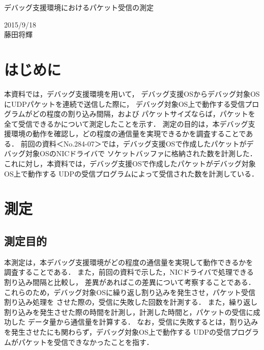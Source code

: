 \documentclass[12pt]{jsarticle}
\begin{document}

\begin{center}
    {\LARGE デバッグ支援環境におけるパケット受信の測定}
\end{center}

\begin{flushright}
    2015/9/18\\
    藤田将輝
\end{flushright}
\section{はじめに}
本資料では，デバッグ支援環境を用いて，
デバッグ支援OSからデバッグ対象OSにUDPパケットを連続で送信した際に，
デバッグ対象OS上で動作する受信プログラムがどの程度の割り込み間隔，および
パケットサイズならば，パケットを全て受信できるかについて測定したことを示す．
測定の目的は，本デバッグ支援環境の動作を確認し，どの程度の通信量を実現できるかを調査することである．
前回の資料＜No.284-07＞では，デバッグ支援OSで作成したパケットがデバッグ対象OSのNICドライバで
ソケットバッファに格納された数を計測した．
これに対し，本資料では，デバッグ支援OSで作成したパケットがデバッグ対象OS上で動作する
UDPの受信プログラムによって受信された数を計測している．

\section{測定}
\subsection{測定目的}
本測定は，本デバッグ支援環境がどの程度の通信量を実現して動作できるかを
調査することである．
また，前回の資料で示した，NICドライバで処理できる割り込み間隔と比較し，
差異があればこの差異について考察することである．
これらのため，デバッグ対象OSに繰り返し割り込みを発生させ，パケット受信割り込み処理を
させた際の，受信に失敗した回数を計測する．
また，繰り返し割り込みを発生させた際の時間を計測し，計測した時間と，パケットの受信に成功した
データ量から通信量を計算する．
なお，受信に失敗するとは，割り込みを発生させたにも関わらず，デバッグ対象OS上で動作する
UDPの受信プログラムがパケットを受信できなかったことを指す．
\end{document}
